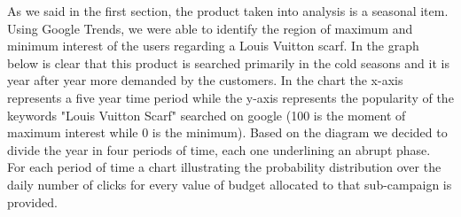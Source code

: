 As we said in the first section, the product taken into analysis is a seasonal item. Using Google Trends, we were able to identify the region of maximum and minimum interest of the users regarding a Louis Vuitton scarf. In the graph below is clear that this product is searched primarily in the cold seasons and it is year after year more demanded by the customers. In the chart the x-axis represents a five year time period while the y-axis represents the popularity of the keywords "Louis Vuitton Scarf" searched on google (100 is the moment of maximum interest while 0 is the minimum).
Based on the diagram we decided to divide the year in four periods of time, each one underlining an abrupt phase.\newline\\
For each period of time a chart illustrating the probability distribution over the daily number of clicks for every value of budget allocated to that sub-campaign is provided.\newline
{} 
